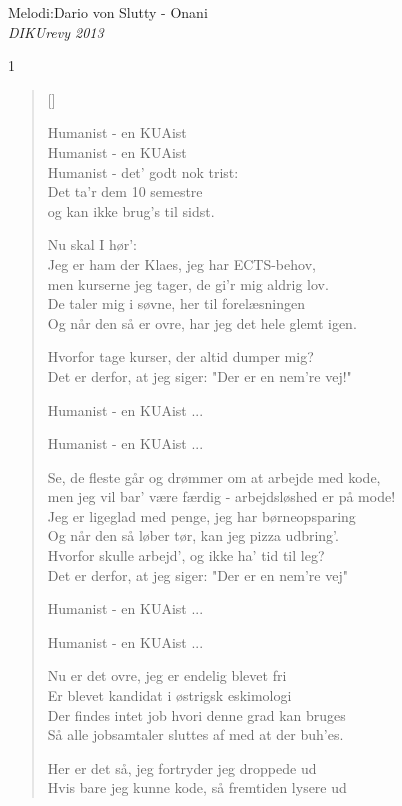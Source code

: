 {Melodi:Dario von Slutty - Onani}\\[.2em]
{\small\itshape DIKUrevy 2013}
\begin{multicols}1
\settowidth{\versewidth}{men jeg vil bar' være færdig - arbejdsløshed er på mode!}
\begin{verse}[\versewidth]

Humanist - en KUAist\\
Humanist - en KUAist\\
Humanist - det' godt nok trist:\\
Det ta'r dem 10 semestre\\
og kan ikke brug's til sidst.

Nu skal I hør':\\
Jeg er ham der Klaes, jeg har ECTS-behov,\\
men kurserne jeg tager, de gi'r mig aldrig lov.\\
De taler mig i søvne, her til forelæsningen\\
Og når den så er ovre, har jeg det hele glemt igen.

Hvorfor tage kurser, der altid dumper mig?\\
Det er derfor, at jeg siger: "Der er en nem're vej!"

Humanist - en KUAist ...

Humanist - en KUAist ...

Se, de fleste går og drømmer om at arbejde med kode,\\
men jeg vil bar' være færdig - arbejdsløshed er på mode!\\
Jeg er ligeglad med penge, jeg har børneopsparing\\
Og når den så løber tør, kan jeg pizza udbring'.\\
Hvorfor skulle arbejd', og ikke ha' tid til leg?\\
Det er derfor, at jeg siger: "Der er en nem're vej"

Humanist - en KUAist ...

Humanist - en KUAist ...

Nu er det ovre, jeg er endelig blevet fri\\
Er blevet kandidat i østrigsk eskimologi\\
Der findes intet job hvori denne grad kan bruges\\
Så alle jobsamtaler sluttes af med at der buh'es.

Her er det så, jeg fortryder jeg droppede ud\\
Hvis bare jeg kunne kode, så fremtiden lysere ud


\end{verse}
\end{multicols}
